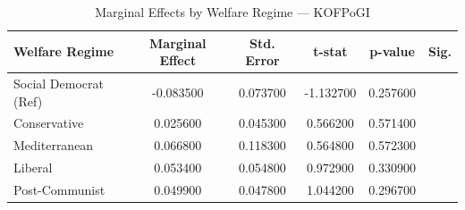 \begin{table}[htbp]
\caption{Marginal Effects by Welfare Regime — KOFPoGI}
\label{tab:marginal_effects_KOFPoGI}
\begin{tabular}{lccccc}
\toprule
Welfare Regime & Marginal Effect & Std. Error & t-stat & p-value & Sig. \\
\midrule
Social Democrat (Ref) & -0.083500 & 0.073700 & -1.132700 & 0.257600 &  \\
Conservative & 0.025600 & 0.045300 & 0.566200 & 0.571400 &  \\
Mediterranean & 0.066800 & 0.118300 & 0.564800 & 0.572300 &  \\
Liberal & 0.053400 & 0.054800 & 0.972900 & 0.330900 &  \\
Post-Communist & 0.049900 & 0.047800 & 1.044200 & 0.296700 &  \\
\bottomrule
\end{tabular}
\end{table}
